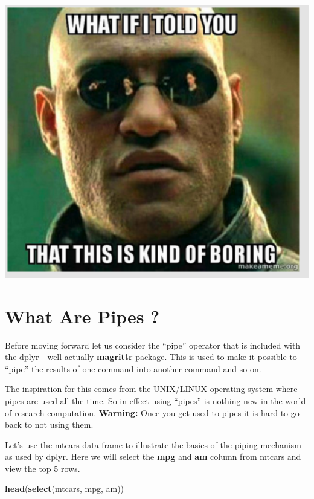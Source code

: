 \documentclass[]{book}
\newenvironment{Shaded}{\begin{snugshade}}{\end{snugshade}}
\newcommand{\KeywordTok}[1]{\textcolor[rgb]{0.13,0.29,0.53}{\textbf{#1}}}
\newcommand{\NormalTok}[1]{#1}
\begin{document}
\includegraphics[width=6.25in,height=\textheight]{./figures/morpheus.png}

\hypertarget{what-are-pipes}{%
\section{What Are Pipes ?}\label{what-are-pipes}}

Before moving forward let us consider the ``pipe'' operator that is included with the dplyr - well actually \textbf{magrittr} package. This is used to make it possible to ``pipe'' the results of one command into another command and so on.

The inspiration for this comes from the UNIX/LINUX operating system where pipes are used all the time. So in effect using ``pipes'' is nothing new in the world of research computation. \textbf{Warning:} Once you get used to pipes it is hard to go back to not using them.

Let's use the mtcars data frame to illustrate the basics of the piping mechanism as used by dplyr. Here we will select the \textbf{mpg} and \textbf{am} column from mtcars and view the top 5 rows.

\begin{Shaded}
\begin{Highlighting}[]
\KeywordTok{head}\NormalTok{(}\KeywordTok{select}\NormalTok{(mtcars, mpg, am))}
\end{Highlighting}
\end{Shaded}
\end{document}
